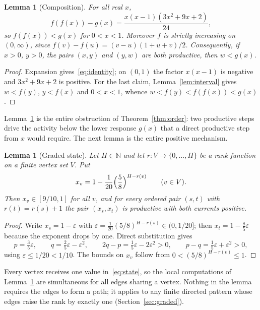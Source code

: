 \documentclass[11pt,a4paper]{article}
\theoremstyle{plain}
\newtheorem{lemma}[theorem]{Lemma}
\theoremstyle{definition}
\theoremstyle{remark}
\newcommand{\N}{\mathbb{N}}
\begin{document}
\begin{lemma}[Composition]\label{lem:composition}
For all real $x$,
\begin{equation}\label{eq:identity}
f(f(x))-g(x)=\frac{x(x-1)(3x^2+9x+2)}{24},
\end{equation}
so $f(f(x))<g(x)$ for $0<x<1$. Moreover $f$ is strictly increasing on $(0,\infty)$, since $f(v)-f(u)=(v-u)(1+u+v)/2$. Consequently, if $x>0$, $y>0$, the pairs $(x,y)$ and $(y,w)$ are both productive, then $w<g(x)$.
\end{lemma}
\begin{proof}
Expansion gives~\eqref{eq:identity}; on $(0,1)$ the factor $x(x-1)$ is negative and $3x^2+9x+2$ is positive. For the last claim, Lemma~\ref{lem:interval} gives $w<f(y)$, $y<f(x)$ and $0<x<1$, whence $w<f(y)<f(f(x))<g(x)$.
\end{proof}

Lemma~\ref{lem:composition} is the entire obstruction of Theorem~\ref{thm:order}: two productive steps drive the activity below the lower response $g(x)$ that a direct productive step from $x$ would require. The next lemma is the entire positive mechanism.

\begin{lemma}[Graded state]\label{lem:graded}
Let $H\in\N$ and let $r\colon V\to\{0,\dots,H\}$ be a rank function on a finite vertex set $V$. Put
\begin{equation}\label{eq:state}
x_v=1-\frac{1}{20}\Bigl(\frac58\Bigr)^{H-r(v)}\qquad(v\in V).
\end{equation}
Then $x_v\in[9/10,1]$ for all $v$, and for every ordered pair $(s,t)$ with $r(t)=r(s)+1$ the pair $(x_s,x_t)$ is productive with both currents positive.
\end{lemma}
\begin{proof}
Write $x_s=1-\varepsilon$ with $\varepsilon=\frac1{20}(5/8)^{H-r(s)}\in(0,1/20]$; then $x_t=1-\frac85\varepsilon$ because the exponent drops by one. Direct substitution gives
\[
p=\tfrac35\varepsilon,\qquad q=\tfrac25\varepsilon-\varepsilon^2,\qquad 2q-p=\tfrac15\varepsilon-2\varepsilon^2>0,\qquad p-q=\tfrac15\varepsilon+\varepsilon^2>0,
\]
using $\varepsilon\le1/20<1/10$. The bounds on $x_v$ follow from $0<(5/8)^{H-r(v)}\le1$.
\end{proof}

Every vertex receives one value in~\eqref{eq:state}, so the local computations of Lemma~\ref{lem:graded} are simultaneous for all edges sharing a vertex. Nothing in the lemma requires the edges to form a path; it applies to any finite directed pattern whose edges raise the rank by exactly one (Section~\ref{sec:graded}).
\end{document}
